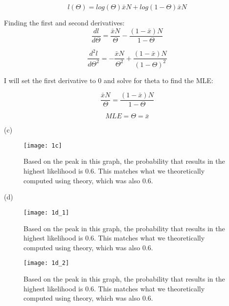 \documentclass[11pt]{article}
\begin{document}
\begin{enumerate}
            \begin{equation}
                l(\Theta)=log(\Theta) \bar{x}N+ log(1-\Theta ) \bar{x}N
            \end{equation}
            
            Finding the first and second derivatives:
            \begin{equation}
                \frac{dl}{d\Theta}=\frac{\bar{x}N}{\Theta }-\frac{(1-\bar{x})N}{1-\Theta}
            \end{equation}
            
            \begin{equation}
                \frac{d^{2}l}{d\Theta^{2}}=-\frac{\bar{x}N}{\Theta^{2} }+\frac{(1-\bar{x})N}{(1-\Theta)^{2}}
            \end{equation}
            
            I will set the first derivative to 0 and solve for theta to find the MLE:
            
            \begin{equation}
                \frac{\bar{x}N}{\Theta}=\frac{(1-\bar{x})N}{1-\Theta}
            \end{equation}
            
            \begin{equation}
                MLE=\Theta=\bar{x}
            \end{equation}
        
        
        (c)
            \begin{figure}[h]
                \centering
                \texttt{[image: 1c]}
                \caption{Based on the peak in this graph, the probability that results in the highest likelihood is 0.6. This matches what we theoretically computed using theory, which was also 0.6.}
            \end{figure}
        
        \newpage
        \vfill
        
        (d)
            \begin{figure}[h]
            \centering
            \texttt{[image: 1d\_1]}
            \caption{Based on the peak in this graph, the probability that results in the highest likelihood is 0.6. This matches what we theoretically computed using theory, which was also 0.6.}
            \end{figure}
        
        
            \begin{figure}[h]
                \centering
                \texttt{[image: 1d\_2]}
                \caption{Based on the peak in this graph, the probability that results in the highest likelihood is 0.6. This matches what we theoretically computed using theory, which was also 0.6.}
            \end{figure}
            

\end{enumerate}
\end{document}

